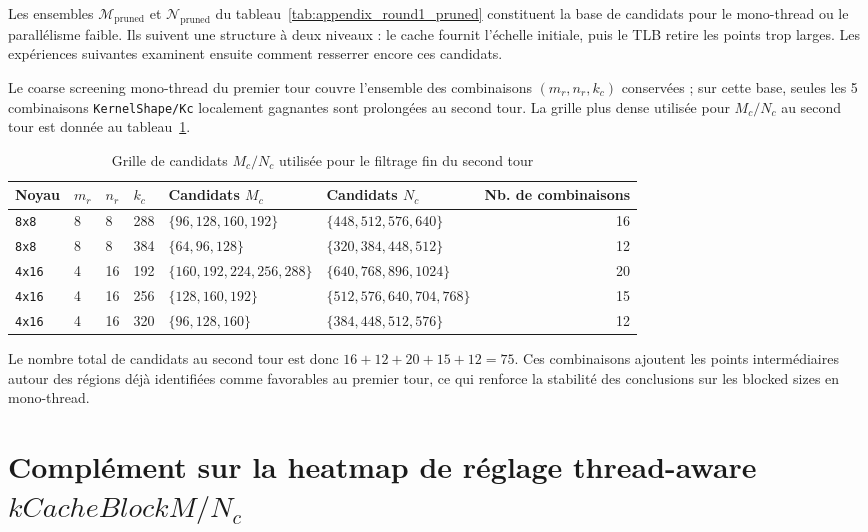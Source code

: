 \documentclass[a4paper,11pt,oneside]{article}
\begin{document}
Les ensembles $\mathcal{M}_{\text{pruned}}$ et $\mathcal{N}_{\text{pruned}}$ du tableau~\ref{tab:appendix_round1_pruned} constituent la base de candidats pour le mono-thread ou le parallélisme faible. Ils suivent une structure à deux niveaux : le cache fournit l'échelle initiale, puis le TLB retire les points trop larges. Les expériences suivantes examinent ensuite comment resserrer encore ces candidats.

Le coarse screening mono-thread du premier tour couvre l'ensemble des combinaisons $(m_r,n_r,k_c)$ conservées ; sur cette base, seules les 5 combinaisons \texttt{KernelShape/Kc} localement gagnantes sont prolongées au second tour. La grille plus dense utilisée pour $M_c/N_c$ au second tour est donnée au tableau~\ref{tab:appendix_round2_grids}.

\begin{table}[H]
\centering
\begin{tabular}{lll l p{} p{} r}
\toprule
\textbf{Noyau} & \textbf{$m_r$} & \textbf{$n_r$} & \textbf{$k_c$} & \textbf{Candidats $M_c$} & \textbf{Candidats $N_c$} & \textbf{Nb. de combinaisons} \\
\midrule
\texttt{8x8}  & 8 & 8  & 288 & $\{96,128,160,192\}$ & $\{448,512,576,640\}$ & 16 \\
\texttt{8x8}  & 8 & 8  & 384 & $\{64,96,128\}$ & $\{320,384,448,512\}$ & 12 \\
\texttt{4x16} & 4 & 16 & 192 & $\{160,192,224,256,288\}$ & $\{640,768,896,1024\}$ & 20 \\
\texttt{4x16} & 4 & 16 & 256 & $\{128,160,192\}$ & $\{512,576,640,704,768\}$ & 15 \\
\texttt{4x16} & 4 & 16 & 320 & $\{96,128,160\}$ & $\{384,448,512,576\}$ & 12 \\
\bottomrule
\end{tabular}
\caption{Grille de candidats $M_c/N_c$ utilisée pour le filtrage fin du second tour}
\label{tab:appendix_round2_grids}
\end{table}

Le nombre total de candidats au second tour est donc $16+12+20+15+12=75$. Ces combinaisons ajoutent les points intermédiaires autour des régions déjà identifiées comme favorables au premier tour, ce qui renforce la stabilité des conclusions sur les blocked sizes en mono-thread.

\section{Complément sur la heatmap de réglage thread-aware $kCacheBlockM/N_c$}\label{app:mc_nc_heatmap}
\end{document}
